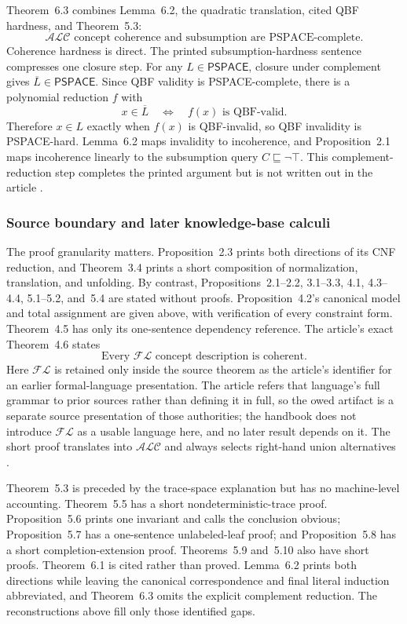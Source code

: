 Theorem~6.3 combines Lemma~6.2, the quadratic translation, cited QBF hardness,
and Theorem~5.3:
\[
 \boxed{\text{\(\mathcal{ALC}\) concept coherence and subsumption are
 PSPACE-complete.}}
\]
Coherence hardness is direct.  The printed subsumption-hardness sentence
compresses one closure step.  For any \(L\in\mathsf{PSPACE}\), closure under
complement gives \(\overline L\in\mathsf{PSPACE}\).  Since QBF validity is
PSPACE-complete, there is a polynomial reduction \(f\) with
\[
 x\in\overline L
 \quad\Longleftrightarrow\quad
 f(x)\text{ is QBF-valid}.
\]
Therefore \(x\in L\) exactly when \(f(x)\) is QBF-invalid, so QBF invalidity
is PSPACE-hard.  Lemma~6.2 maps invalidity to incoherence, and
Proposition~2.1 maps incoherence linearly to the subsumption query
\(C\sqsubseteq\neg\top\).  This complement-reduction step completes the
printed argument but is not written out in the article
\cite[Thm.~6.3, p.~21]{SchmidtSchaussSmolka1991}.

\subsubsection{Source boundary and later knowledge-base calculi}

The proof granularity matters.  Proposition~2.3 prints both directions of its
CNF reduction, and Theorem~3.4 prints a short composition of normalization,
translation, and unfolding.  By contrast, Propositions~2.1--2.2, 3.1--3.3,
4.1, 4.3--4.4, 5.1--5.2, and~5.4 are stated without proofs.
Proposition~4.2's canonical model and total assignment are given above,
with verification of every constraint form.  Theorem~4.5 has
only its one-sentence dependency reference.  The article's exact Theorem~4.6
states
\[
 \text{Every \(\mathcal{FL}\) concept description is coherent.}
\]
Here \(\mathcal{FL}\) is retained only inside the source theorem as the
article's identifier for an earlier formal-language presentation.  The article
refers that language's full grammar to prior sources rather than defining it in
full, so the owed artifact is a separate source presentation of those
authorities; the handbook does not introduce \(\mathcal{FL}\) as a usable
language here, and no later result depends on it.  The short proof translates
into \(\mathcal{ALC}\) and always selects right-hand union alternatives
\cite[Thm.~4.6, p.~13]{SchmidtSchaussSmolka1991}.

Theorem~5.3 is preceded by the trace-space explanation but has no machine-level
accounting.  Theorem~5.5 has a short nondeterministic-trace proof.
Proposition~5.6 prints one invariant and calls the conclusion obvious;
Proposition~5.7 has a one-sentence unlabeled-leaf proof; and
Proposition~5.8 has a short completion-extension proof.  Theorems~5.9 and~5.10
also have short proofs.  Theorem~6.1 is cited rather than proved.
Lemma~6.2 prints both directions while leaving the canonical correspondence
and final literal induction abbreviated, and Theorem~6.3 omits the explicit
complement reduction.  The reconstructions above fill only those identified
gaps.

